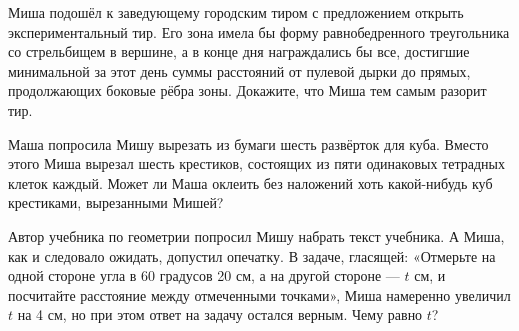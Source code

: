 \begin{itemize}
\itA Миша подошёл к заведующему городским тиром с предложением открыть экспериментальный тир. Его зона имела бы форму равнобедренного треугольника со стрельбищем в вершине, а в конце дня награждались бы все, достигшие минимальной за этот день суммы расстояний от пулевой дырки до прямых, продолжающих боковые рёбра зоны. Докажите, что Миша тем самым разорит тир.

\itB Маша попросила Мишу вырезать из бумаги шесть развёрток для куба. Вместо этого Миша вырезал шесть крестиков, состоящих из пяти одинаковых тетрадных клеток каждый. Может ли Маша оклеить без наложений хоть какой-нибудь куб крестиками, вырезанными Мишей?

\itC Автор учебника по геометрии попросил Мишу набрать текст учебника. А Миша, как и следовало ожидать, допустил опечатку. В задаче, гласящей: «Отмерьте на одной стороне угла в 60 градусов 20 см, а на другой стороне — $t$ см, и посчитайте расстояние между отмеченными точками», Миша намеренно увеличил $t$ на 4 см, но при этом ответ на задачу остался верным. Чему равно $t$?
\end{itemize}
